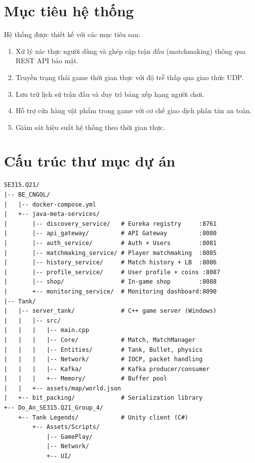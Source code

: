 \documentclass[12pt,a4paper]{report}
\begin{document}
\section{Mục tiêu hệ thống}

Hệ thống được thiết kế với các mục tiêu sau:

\begin{enumerate}
  \item Xử lý xác thực người dùng và ghép cặp trận đấu (matchmaking) thông qua REST API bảo mật.
  \item Truyền trạng thái game thời gian thực với độ trễ thấp qua giao thức UDP.
  \item Lưu trữ lịch sử trận đấu và duy trì bảng xếp hạng người chơi.
  \item Hỗ trợ cửa hàng vật phẩm trong game với cơ chế giao dịch phân tán an toàn.
  \item Giám sát hiệu suất hệ thống theo thời gian thực.
\end{enumerate}

\section{Cấu trúc thư mục dự án}

\begin{lstlisting}[style=bashStyle,
  caption={Cấu trúc thư mục tổng quan dự án},
  label={lst:folderstructure}]
SE315.Q21/
|-- BE_CNGOL/
|   |-- docker-compose.yml
|   +-- java-meta-services/
|       |-- discovery_service/   # Eureka registry     :8761
|       |-- api_gateway/         # API Gateway         :8080
|       |-- auth_service/        # Auth + Users        :8081
|       |-- matchmaking_service/ # Player matchmaking  :8085
|       |-- history_service/     # Match history + LB  :8086
|       |-- profile_service/     # User profile + coins :8087
|       |-- shop/                # In-game shop        :8088
|       +-- monitoring_service/  # Monitoring dashboard:8090
|-- Tank/
|   |-- server_tank/             # C++ game server (Windows)
|   |   |-- src/
|   |   |   |-- main.cpp
|   |   |   |-- Core/            # Match, MatchManager
|   |   |   |-- Entities/        # Tank, Bullet, physics
|   |   |   |-- Network/         # IOCP, packet handling
|   |   |   |-- Kafka/           # Kafka producer/consumer
|   |   |   +-- Memory/          # Buffer pool
|   |   +-- assets/map/world.json
|   +-- bit_packing/             # Serialization library
+-- Do_An_SE315.Q21_Group_4/
    +-- Tank Legends/            # Unity client (C#)
        +-- Assets/Scripts/
            |-- GamePlay/
            |-- Network/
            +-- UI/
\end{lstlisting}
\end{document}

